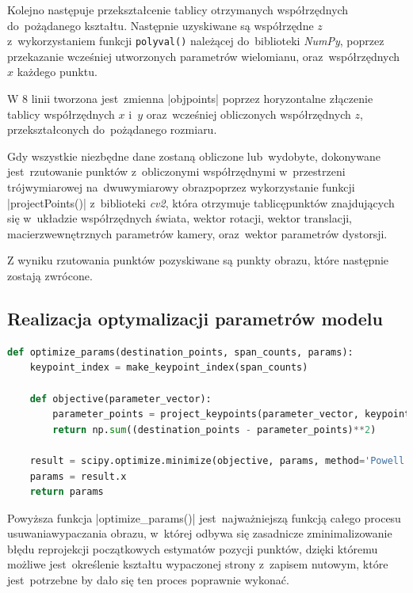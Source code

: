 Kolejno następuje przekształcenie tablicy otrzymanych współrzędnych do~pożądanego kształtu. Następnie uzyskiwane są współrzędne $z$ z~wykorzystaniem funkcji \lstinline|polyval()| należącej do~biblioteki \textit{NumPy}, poprzez przekazanie wcześniej utworzonych parametrów wielomianu, oraz~współrzędnych $x$ każdego punktu.

W 8 linii tworzona jest~zmienna \pyth|objpoints| poprzez horyzontalne złączenie tablicy współrzędnych $x$ i~$y$ oraz~wcześniej obliczonych współrzędnych $z$, przekształconych do~pożądanego rozmiaru.

Gdy wszystkie niezbędne dane zostaną obliczone lub~wydobyte, dokonywane jest~rzutowanie punktów z~obliczonymi współrzędnymi w~przestrzeni trójwymiarowej na~dwuwymiarowy obraz\linebreak poprzez wykorzystanie funkcji \pyth|projectPoints()| z~biblioteki \textit{cv2}, która otrzymuje tablicę\linebreak punktów znajdujących się w~układzie współrzędnych świata, wektor rotacji, wektor translacji, macierz\linebreak wewnętrznych parametrów kamery, oraz~wektor parametrów dystorsji. 

Z wyniku rzutowania punktów pozyskiwane są punkty obrazu, które następnie zostają zwrócone.

\newpage

\subsection{Realizacja optymalizacji parametrów modelu}

\begin{lstlisting}[caption={\pyth|optimize_params()| - funkcja optymalizucjąca parametry modelu.}, label={optimize-params}, language=Python]
def optimize_params(destination_points, span_counts, params):
	keypoint_index = make_keypoint_index(span_counts)
	
	def objective(parameter_vector):
		parameter_points = project_keypoints(parameter_vector, keypoint_index)
		return np.sum((destination_points - parameter_points)**2)
	
	result = scipy.optimize.minimize(objective, params, method='Powell')
	params = result.x
	return params
\end{lstlisting}

Powyższa funkcja \pyth|optimize_params()| jest~najważniejszą funkcją całego procesu usuwania\linebreak wypaczania obrazu, w~której odbywa się zasadnicze zminimalizowanie błędu reprojekcji początkowych estymatów pozycji punktów, dzięki któremu możliwe jest~określenie kształtu wypaczonej strony z~zapisem nutowym, które jest~potrzebne by dało się ten proces poprawnie wykonać.

